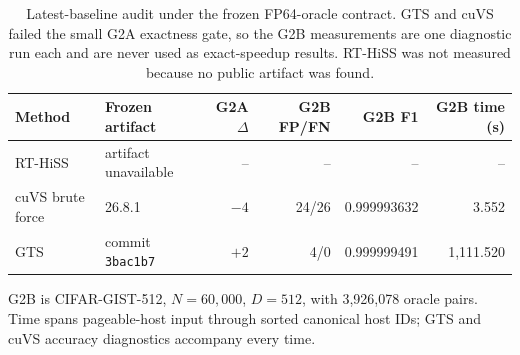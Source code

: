 \begin{table}[t]
  \centering
  \caption{Latest-baseline audit under the frozen FP64-oracle contract.  GTS
  and cuVS failed the small G2A exactness gate, so the G2B measurements are one
  diagnostic run each and are never used as exact-speedup results.  RT-HiSS
  was not measured because no public artifact was found.}
  \label{tab:latest-baselines}
  \small
  \begin{tabular}{llrrrr}
    \toprule
    Method & Frozen artifact & G2A $\Delta$ & G2B FP/FN & G2B F1 & G2B time (s) \\
    \midrule
    RT-HiSS & artifact unavailable & -- & -- & -- & -- \\
    cuVS brute force & 26.8.1 & $-4$ & 24/26 & 0.999993632 & 3.552 \\
    GTS & commit \texttt{3bac1b7} & $+2$ & 4/0 & 0.999999491 & 1,111.520 \\
    \bottomrule
  \end{tabular}
  \vspace{2pt}

  \footnotesize G2B is CIFAR-GIST-512, $N=60{,}000$, $D=512$, with
  3,926,078 oracle pairs.  Time spans pageable-host input through sorted
  canonical host IDs; GTS and cuVS accuracy diagnostics accompany every time.
\end{table}
